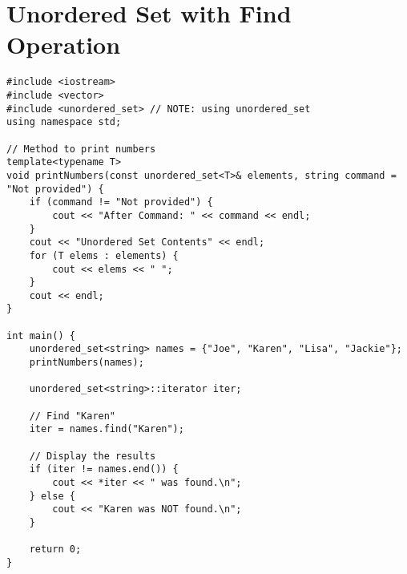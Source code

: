 \documentclass[12pt]{article}
\begin{document}
\section*{Unordered Set with Find Operation}
\begin{verbatim}
#include <iostream>
#include <vector>
#include <unordered_set> // NOTE: using unordered_set
using namespace std;

// Method to print numbers
template<typename T>
void printNumbers(const unordered_set<T>& elements, string command = "Not provided") {
    if (command != "Not provided") {
        cout << "After Command: " << command << endl;
    }
    cout << "Unordered Set Contents" << endl;
    for (T elems : elements) {
        cout << elems << " ";
    }
    cout << endl;
}

int main() {
    unordered_set<string> names = {"Joe", "Karen", "Lisa", "Jackie"};
    printNumbers(names);

    unordered_set<string>::iterator iter;

    // Find "Karen"
    iter = names.find("Karen");

    // Display the results
    if (iter != names.end()) {
        cout << *iter << " was found.\n";
    } else {
        cout << "Karen was NOT found.\n";
    }

    return 0;
}

\end{verbatim}
\end{document}
